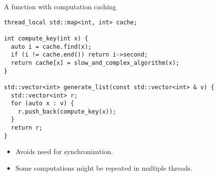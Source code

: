 \begin{frame}[t,fragile]
\begin{block}{A function with computation caching}
\begin{lstlisting}
thread_local std::map<int, int> cache;

int compute_key(int x) {
  auto i = cache.find(x);
  if (i != cache.end()) return i->second;
  return cache[x] = slow_and_complex_algorithm(x);
}

std::vector<int> generate_list(const std::vector<int> & v) {
  std::vector<int> r;
  for (auto x : v) {
    r.push_back(compute_key(x));
  }
  return r;
}
\end{lstlisting}
\end{block}
\begin{itemize}
  \item Avoids need for synchronization.
  \item Some computations might be repeated in multiple threads.
\end{itemize}
\end{frame}
